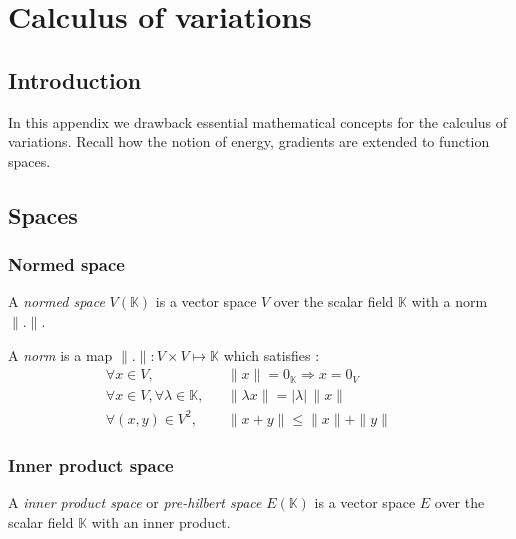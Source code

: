 \appendix
\chapter{Calculus of variations}

\section{Introduction}
In this appendix we drawback essential mathematical concepts for the calculus of variations.
Recall how the notion of energy, gradients are extended to function spaces.

\cite{Abraham2002}

\section{Spaces}

\subsection{Normed space}
A \emph{normed space} $V(\mathbb{K})$ is a vector space $V$ over the scalar field $\mathbb{K}$ with a norm $\|.\|$.

A \emph{norm} is a map $\| . \| : V \times V \longmapsto \mathbb{K}$ which satisfies :
\begin{subequations}
\begin{align}
	&\forall x \in V, 							&& \|x\| = 0_\mathbb{K} \Rightarrow x = 0_V&&&\\
	&\forall x \in V, \forall \lambda \in \mathbb{K}, 	&& \|\lambda x\| = |\lambda| \,\|x\|&&&\\
	&\forall (x,y) \in V^2, 						&& \|x + y\| \leqslant \|x\| + \|y\|&&&
\end{align}
\end{subequations}


\subsection{Inner product space}
A \emph{inner product space} or \emph{pre-hilbert space} $E(\mathbb{K})$ is a vector space $E$ over the scalar field $\mathbb{K}$ with an inner product.

